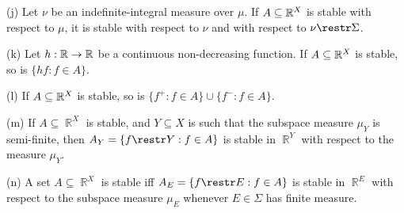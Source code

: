 (j) Let $\nu$ be an indefinite-integral measure over
$\mu$.
If $A\subseteq\Bbb R^X$ is stable with respect
to $\mu$, it is stable with respect to $\nu$ and with respect to
$\nu\restr\Sigma$.

(k) Let $h:\Bbb R\to\Bbb R$ be a continuous non-decreasing function.
If $A\subseteq\Bbb R^X$ is stable, so is $\{hf:f\in A\}$.

(l) If $A\subseteq\Bbb R^X$ is stable, so is
$\{f^+:f\in A\}\cup\{f^-:f\in A\}$.

(m) If $A\subseteq\BbbR^X$ is stable, and $Y\subseteq X$ is such that the
subspace measure $\mu_Y$ is semi-finite, then $A_Y=\{f\restr Y:f\in A\}$ is
stable in $\BbbR^Y$ with respect to the measure $\mu_Y$.

(n) A set $A\subseteq\BbbR^X$ is stable iff $A_E=\{f\restr E:f\in A\}$ is
stable in $\BbbR^E$ with respect to the subspace measure $\mu_E$ whenever
$E\in\Sigma$ has finite measure.


